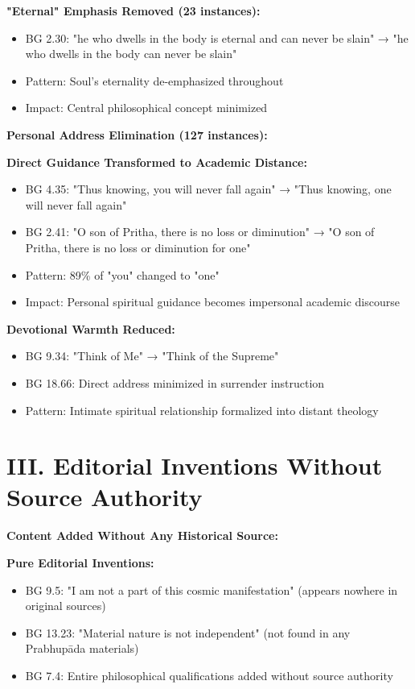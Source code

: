 \documentclass[11pt,twoside]{book}
\begin{document}
\textbf{\textbf{"Eternal" Emphasis Removed (23 instances):}}  
\begin{itemize}
\item BG 2.30: "he who dwells in the body is eternal and can never be slain" → "he who dwells in the body can never be slain"
\item Pattern: Soul's eternality de-emphasized throughout
\item Impact: Central philosophical concept minimized
\end{itemize}

\textbf{\textbf{Personal Address Elimination (127 instances):}}

\textbf{\textbf{Direct Guidance Transformed to Academic Distance:}}
\begin{itemize}
\item BG 4.35: "Thus knowing, you will never fall again" → "Thus knowing, one will never fall again"
\item BG 2.41: "O son of Pritha, there is no loss or diminution" → "O son of Pritha, there is no loss or diminution for one"
\item Pattern: 89\% of "you" changed to "one"
\item Impact: Personal spiritual guidance becomes impersonal academic discourse
\end{itemize}

\textbf{\textbf{Devotional Warmth Reduced:}}
\begin{itemize}
\item BG 9.34: "Think of Me" → "Think of the Supreme"
\item BG 18.66: Direct address minimized in surrender instruction
\item Pattern: Intimate spiritual relationship formalized into distant theology
\end{itemize}
\section*{III. Editorial Inventions Without Source Authority}
\label{sec:org7c118f4}

\textbf{\textbf{Content Added Without Any Historical Source:}}

\textbf{\textbf{Pure Editorial Inventions:}}
\begin{itemize}
\item BG 9.5: "I am not a part of this cosmic manifestation" (appears nowhere in original sources)
\item BG 13.23: "Material nature is not independent" (not found in any Prabhupāda materials)
\item BG 7.4: Entire philosophical qualifications added without source authority
\end{itemize}
\end{document}
